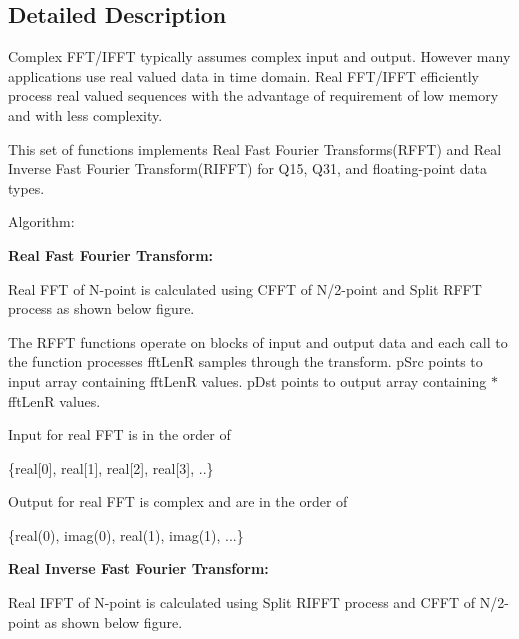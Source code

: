 \subsection{Detailed Description}
\begin{DoxyParagraph}{}
Complex F\-F\-T/\-I\-F\-F\-T typically assumes complex input and output. However many applications use real valued data in time domain. Real F\-F\-T/\-I\-F\-F\-T efficiently process real valued sequences with the advantage of requirement of low memory and with less complexity.
\end{DoxyParagraph}
\begin{DoxyParagraph}{}
This set of functions implements Real Fast Fourier Transforms(\-R\-F\-F\-T) and Real Inverse Fast Fourier Transform(\-R\-I\-F\-F\-T) for Q15, Q31, and floating-\/point data types.
\end{DoxyParagraph}
\begin{DoxyParagraph}{Algorithm\-: }

\end{DoxyParagraph}
{\bfseries Real Fast Fourier Transform\-:} \begin{DoxyParagraph}{}
Real F\-F\-T of N-\/point is calculated using C\-F\-F\-T of N/2-\/point and Split R\-F\-F\-T process as shown below figure. 
\end{DoxyParagraph}
\begin{DoxyParagraph}{}
 
\end{DoxyParagraph}
\begin{DoxyParagraph}{}
The R\-F\-F\-T functions operate on blocks of input and output data and each call to the function processes {\ttfamily fft\-Len\-R} samples through the transform. {\ttfamily p\-Src} points to input array containing {\ttfamily fft\-Len\-R} values. {\ttfamily p\-Dst} points to output array containing {$\ast$fft\-Len\-R} values. \par
 Input for real F\-F\-T is in the order of 
\begin{DoxyPre}\{real[0], real[1], real[2], real[3], ..\}\end{DoxyPre}
 Output for real F\-F\-T is complex and are in the order of 
\begin{DoxyPre}\{real(0), imag(0), real(1), imag(1), ...\}\end{DoxyPre}

\end{DoxyParagraph}
{\bfseries Real Inverse Fast Fourier Transform\-:} \begin{DoxyParagraph}{}
Real I\-F\-F\-T of N-\/point is calculated using Split R\-I\-F\-F\-T process and C\-F\-F\-T of N/2-\/point as shown below figure. 
\end{DoxyParagraph}
